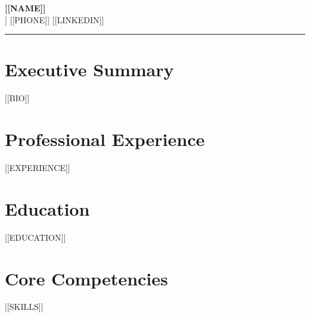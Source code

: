 \documentclass[10pt,letterpaper]{article}
\begin{document}
\begin{flushleft}
    {\LARGE \bfseries [[NAME]]} \\
    [[EMAIL]] \textbullet{} [[PHONE]] \textbullet{} [[LINKEDIN]]
\end{flushleft}

\hrule
\vspace{1em}

\section*{Executive Summary}
[[BIO]]

\section*{Professional Experience}
[[EXPERIENCE]]

\section*{Education}
[[EDUCATION]]

\section*{Core Competencies}
[[SKILLS]]
\end{document}

